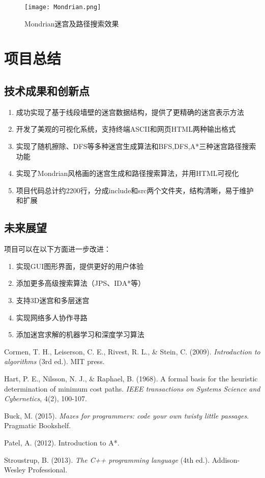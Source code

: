 \documentclass[UTF8]{ctexart}
\begin{document}
\begin{figure}[h!]
    \centering
    \texttt{[image: Mondrian.png]}
    \caption{Mondrian迷宫及路径搜索效果}
    \label{fig:Mondrian迷宫及路径搜索效果图}
\end{figure}
\newpage
\section{项目总结}

\subsection{技术成果和创新点}
\begin{enumerate}
    \item 成功实现了基于线段墙壁的迷宫数据结构，提供了更精确的迷宫表示方法
    \item 开发了美观的可视化系统，支持终端ASCII和网页HTML两种输出格式
    \item 实现了随机擦除、DFS等多种迷宫生成算法和BFS,DFS,A*三种迷宫路径搜索功能
    \item 实现了Mondrian风格画的迷宫生成和路径搜索算法，并用HTML可视化
    \item 项目代码总计约2200行，分成include和src两个文件夹，结构清晰，易于维护和扩展
\end{enumerate}


\subsection{未来展望}
项目可以在以下方面进一步改进：
\begin{enumerate}
    \item 实现GUI图形界面，提供更好的用户体验
    \item 添加更多高级搜索算法（JPS、IDA*等）
    \item 支持3D迷宫和多层迷宫
    \item 实现网络多人协作寻路
    \item 添加迷宫求解的机器学习和深度学习算法
\end{enumerate}


\begin{thebibliography}{9}
Cormen, T. H., Leiserson, C. E., Rivest, R. L., \& Stein, C. (2009). 
\textit{Introduction to algorithms} (3rd ed.). MIT press.

Hart, P. E., Nilsson, N. J., \& Raphael, B. (1968). 
A formal basis for the heuristic determination of minimum cost paths. 
\textit{IEEE transactions on Systems Science and Cybernetics}, 4(2), 100-107.

Buck, M. (2015). 
\textit{Mazes for programmers: code your own twisty little passages}. 
Pragmatic Bookshelf.

Patel, A. (2012). 
Introduction to A*. 

Stroustrup, B. (2013). 
\textit{The C++ programming language} (4th ed.). 
Addison-Wesley Professional.
\end{thebibliography}
\end{document}

